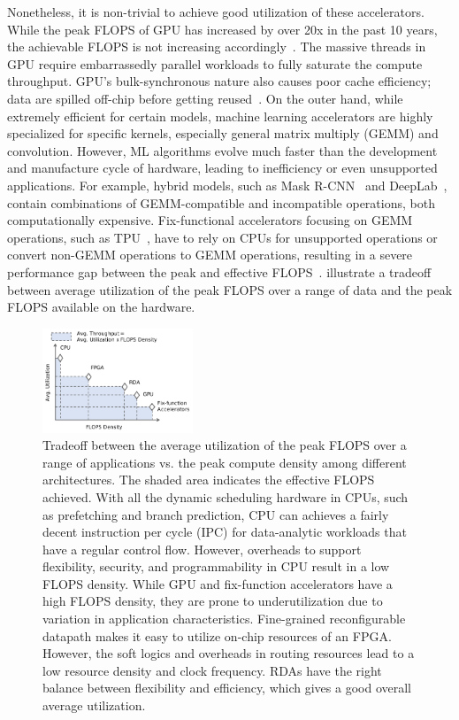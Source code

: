 Nonetheless, it is non-trivial to achieve good utilization of these accelerators.
While the peak FLOPS of GPU has increased by over 20x in the past 10 years, the achievable FLOPS is
not increasing accordingly~\cite{floptrend, gpuperfana}.
The massive threads in GPU require embarrassedly parallel workloads to fully saturate the compute
throughput. GPU's bulk-synchronous nature also causes poor cache efficiency; data are spilled
off-chip before getting reused~\cite{gpuinefficiency}.
On the outer hand, 
while extremely efficient for certain models, machine learning accelerators are highly
specialized for specific kernels, especially general matrix multiply (GEMM) and convolution.
However, ML algorithms evolve much faster than the development and manufacture cycle of hardware, 
leading to inefficiency or even unsupported applications.
For example, hybrid models, such as Mask R-CNN~\cite{maskrcnn} and DeepLab~\cite{deeplab}, contain
combinations of GEMM-compatible and incompatible operations, both computationally expensive.
Fix-functional accelerators focusing on GEMM operations, such as TPU~\cite{tpu}, 
have to rely on CPUs for unsupported operations or
convert non-GEMM operations to GEMM operations, resulting in a severe performance gap between the
peak and effective FLOPS~\cite{effflexdnnaccel}.
 illustrate a tradeoff between average utilization of the peak FLOPS over a range
of data and the peak FLOPS available on the hardware.

\begin{figure}
\centering
\includegraphics[width=0.4\textwidth]{figs/peakutil.pdf}
\caption[Average utilization vs. peak compute density tradeoff]{
 Tradeoff between the average utilization of the peak FLOPS over a range of applications vs. the peak compute density 
 among different architectures.
 The shaded area indicates the effective FLOPS achieved.
 With all the dynamic scheduling hardware in CPUs, such as prefetching and branch prediction, 
 CPU can achieves a fairly decent instruction per cycle (IPC) for data-analytic workloads that have a 
 regular control flow. 
 However, overheads to support flexibility, security, and programmability in CPU result in a low FLOPS
 density. 
 While GPU and fix-function accelerators have a high FLOPS density, they are prone to
 underutilization due to variation in application characteristics. 
 Fine-grained reconfigurable datapath makes it easy to utilize on-chip resources of an FPGA.
 However, the soft logics and overheads in routing resources lead to a low resource density and clock frequency.
 RDAs have the right balance between flexibility and efficiency, which gives a good overall average utilization.
}
\label{fig:peakutil}
\end{figure}


